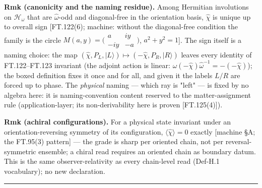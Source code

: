 \begin{definition}
\textbf{Rmk (canonicity and the naming residue).} Among Hermitian involutions on $\mathcal H_\omega$ that are $\hat\omega$-odd and diagonal-free in the orientation basis, $\hat\chi$ is unique up to overall sign [FT.122(6); machine: without the diagonal-free condition the family is the circle $M(a,y)=\bigl(\begin{smallmatrix}a&iy\\-iy&-a\end{smallmatrix}\bigr)$, $a^2+y^2=1$]. The sign itself is a naming choice: the map $(\hat\chi,P_L,|L\rangle)\mapsto(-\hat\chi,P_R,|R\rangle)$ leaves every identity of FT.122–FT.123 invariant (the adjoint action is linear: $\hat\omega(-\hat\chi)\hat\omega^{-1}=-(-\hat\chi)$); the boxed definition fixes it once and for all, and given it the labels $L/R$ are forced up to phase. The \textit{physical} naming — which ray is "left" — is fixed by no algebra here: it is naming-convention content reserved to the matter-assignment rule (application-layer; its non-derivability here is proven [FT.125(4)]).

\textbf{Rmk (achiral configurations).} For a physical state invariant under an orientation-reversing symmetry of its configuration, $\langle\hat\chi\rangle=0$ exactly [machine §A; the FT.95(3) pattern] — the grade is sharp per oriented chain, not per reversal-symmetric ensemble; a chiral read requires an oriented chain as boundary datum. This is the same observer-relativity as every chain-level read (Def-H.1 vocabulary); no new declaration.

\vspace{2pt}\noindent\rule{\textwidth}{0.4pt}\vspace{2pt}

\end{definition}

